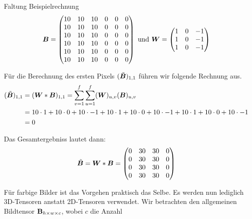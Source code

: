 \begin{examplebox}{Faltung Beispielrechnung}
  \begin{equation*}
    \bm{B} =
    \begin{pmatrix}
      10 & 10 & 10 & 0 & 0 & 0 \\
      10 & 10 & 10 & 0 & 0 & 0 \\
      10 & 10 & 10 & 0 & 0 & 0 \\
      10 & 10 & 10 & 0 & 0 & 0 \\
      10 & 10 & 10 & 0 & 0 & 0 \\
      10 & 10 & 10 & 0 & 0 & 0 \\
    \end{pmatrix}
    \text{ und } \bm{W} =
    \begin{pmatrix}
      1 & 0 & -1 \\
      1 & 0 & -1 \\
      1 & 0 & -1 \\
    \end{pmatrix}
  \end{equation*}

  Für die Berechnung des ersten Pixels $(\tilde{\bm{B}})_{1,1}$ führen wir
  folgende Rechnung aus.
  \begin{align*}
    (\tilde{\bm{B}})_{1,1} &= (\bm{W} * \bm{B})_{1,1} = \sum_{v=1}^{f} \sum_{u=1}^{f} (\bm{W})_{u,v} (\bm{B})_{u,v} \\
                            &= 10 \cdot 1 + 10 \cdot 0 + 10 \cdot -1 + 10 \cdot 1 + 10 \cdot 0 + 10 \cdot -1 + 10 \cdot 1 + 10 \cdot 0 + 10 \cdot -1 \\
                            &= 0
  \end{align*}

  Das Gesamtergebniss lautet dann:
  \begin{equation*}
    \tilde{\bm{B}} = \bm{W} * \bm{B} =
    \begin{pmatrix}
      0 & 30 & 30 & 0 \\
      0 & 30 & 30 & 0 \\
      0 & 30 & 30 & 0 \\
      0 & 30 & 30 & 0 \\
    \end{pmatrix}
  \end{equation*}
\end{examplebox}
\para{}
Für farbige Bilder ist das Vorgehen praktisch das Selbe. Es werden nun
lediglich 3D-Tensoren anstatt 2D-Tensoren verwendet. Wir betrachten den
allgemeinen Bildtensor $\mathbf{B}_{h \times w \times c}$, wobei $c$ die Anzahl
